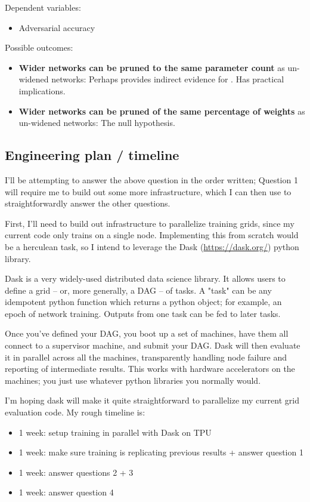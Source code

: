 \documentclass[11pt]{article}
\begin{document}
Dependent variables:
\begin{itemize}
\item Adversarial accuracy
\end{itemize}

Possible outcomes:
\begin{itemize}
\item \textbf{Wider networks can be pruned to the same parameter count} as un-widened networks:
Perhaps provides indirect evidence for \citep{NotBugsFeatures}.
Has practical implications.

\item \textbf{Wider networks can be pruned of the same percentage of weights} as un-widened networks:
The null hypothesis.
\end{itemize}


\subsection{Engineering plan / timeline}
\label{sec:org1760af4}
I'll be attempting to answer the above question in the order written; Question 1 will require me to build out some more infrastructure,
which I can then use to straightforwardly answer the other questions.

First, I'll need to build out infrastructure to parallelize training grids, since my current code only trains on a single node.
Implementing this from scratch would be a herculean task, so I intend to leverage the Dask (\url{https://dask.org/}) python library.

Dask is a very widely-used distributed data science library. It allows users to define a grid -- or, more generally, a DAG -- of
tasks. A "task" can be any idempotent python function which returns a python object; for example, an epoch of network training.
Outputs from one task can be fed to later tasks.

Once you've defined your DAG, you boot up a set of machines, have them all connect to a supervisor machine, and submit your DAG. Dask will then
evaluate it in parallel across all the machines, transparently handling node failure and reporting of intermediate results. This works
with hardware accelerators on the machines; you just use whatever python libraries you normally would.

I'm hoping dask will make it quite straightforward to parallelize my current grid evaluation code. My rough timeline is:

\begin{itemize}
\item 1 week: setup training in parallel with Dask on TPU
\item 1 week: make sure training is replicating previous results + answer question 1
\item 1 week: answer questions 2 + 3
\item 1 week: answer question 4
\end{itemize}
\end{document}
